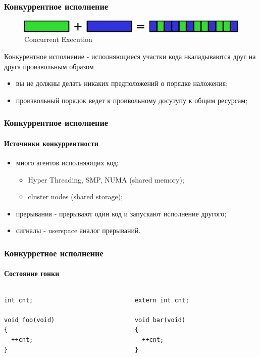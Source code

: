 \begin{frame}
\frametitle{Конкуррентное исполнение}
\begin{figure}
  \centering\includegraphics[width=.8\linewidth]{concurrency}
  \caption{Concurrent Execution}
\end{figure}

Конкурентное исполнение - исполняющиеся участки кода нкаладываются друг на
друга произвольным образом

\begin{itemize}
  \item вы не должны делать никаких предположений о порядке наложения;
  \item произвольный порядок ведет к проивольному досутупу к общим ресурсам;
\end{itemize}
\end{frame}

\begin{frame}
\frametitle{Конкуррентное исполнение}
\framesubtitle{Источники конкуррентности}

\begin{itemize}
  \item<1-> много агентов исполняющих код:
        \begin{itemize}
          \item Hyper Threading, SMP, NUMA (shared memory);
          \item cluster nodes (shared storage);
        \end{itemize}
  \item<2-> прерывания - прерывают один код и запускают исполнение другого;
  \item<3-> сигналы - userspace аналог прерываний.
\end{itemize}
\end{frame}

\begin{frame}[fragile]
\frametitle{Конкурретное исполнение}
\framesubtitle{Состояние гонки}

\begin{columns}[T]
  \begin{column}{.45\linewidth}
    \begin{lstlisting}
int cnt;

void foo(void)
{
  ++cnt;
}
    \end{lstlisting}
  \end{column}
  \begin{column}{.45\linewidth}
    \begin{lstlisting}
extern int cnt;

void bar(void)
{
  ++cnt;
}
    \end{lstlisting}
  \end{column}
\end{columns}
\end{frame}

